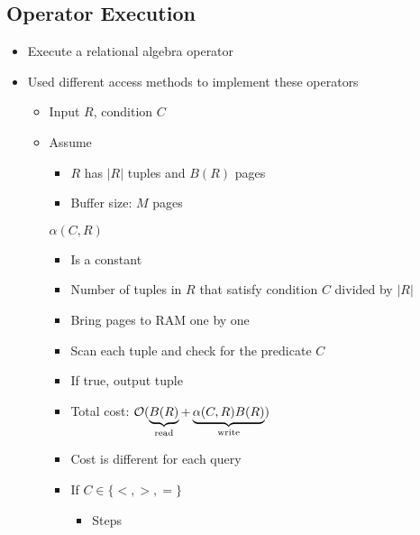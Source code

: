 \subsection{Operator Execution}
\begin{itemize}
    \item Execute a relational algebra operator
    \item Used different access methods to implement these operators
        \begin{itemize}
            \item Input $R$, condition $C$
            \item Assume
                \begin{itemize}
                    \item $R$ has $|R|$ tuples and $B(R)$ pages
                    \item Buffer size: $M$ pages
                \end{itemize}
             $\alpha(C, R)$
                \begin{itemize}
                    \item Is a constant
                    \item Number of tuples in $R$ that satisfy condition $C$ divided by $|R|$
                \end{itemize}
                \begin{itemize}
                    \item Bring pages to RAM one by one
                    \item Scan each tuple and check for the predicate $C$
                    \item If true, output tuple
                    \item Total cost: $\mathcal{O}(\underbrace{B(R)}_{\text{read}} + \underbrace{\alpha(C, R)B(R)}_{\text{write}})$
                    \item Cost is different for each query
                \end{itemize}
                \begin{itemize}
                    \item If $C \in \{<, >, =\}$
                        \begin{itemize}
                            \item Steps
                                \begin{itemize}

\end{itemize}
\end{itemize}
\end{itemize}
\end{itemize}
\end{itemize}

